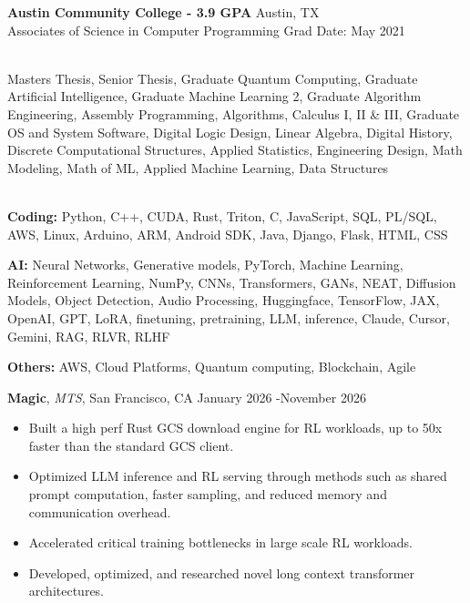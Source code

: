 \documentclass[a4paper,10pt]{article}
\begin{document}
\vspace{1pt}
\noindent\textbf{Austin Community College - \textbf{3.9 GPA}} \hfill Austin, TX \\
Associates of Science in Computer Programming \hfill Grad Date: May 2021

 \\
Masters Thesis, Senior Thesis, Graduate Quantum Computing, Graduate Artificial Intelligence, Graduate Machine Learning 2, Graduate Algorithm Engineering, Assembly Programming, Algorithms, Calculus I, II \& III, Graduate OS and System Software, Digital Logic Design, Linear Algebra, Digital History, Discrete Computational Structures, Applied Statistics, Engineering Design, Math Modeling, Math of ML, Applied Machine Learning, Data Structures


 \vspace{1pt} \\
\textbf{Coding:} Python, C++, CUDA, Rust, Triton, C, JavaScript, SQL, PL/SQL, AWS, Linux, Arduino, ARM, Android SDK, Java, Django, Flask, HTML, CSS

\noindent\textbf{AI:} Neural Networks, Generative models, PyTorch, Machine Learning, Reinforcement Learning, NumPy, CNNs, Transformers, GANs, NEAT, Diffusion Models, Object Detection, Audio Processing, Huggingface, TensorFlow, JAX, OpenAI, GPT, LoRA, finetuning, pretraining, LLM, inference, Claude, Cursor, Gemini, RAG, RLVR, RLHF

\noindent\textbf{Others:} AWS, Cloud Platforms, Quantum computing, Blockchain, Agile







 \vspace{1pt}

\noindent\textbf{Magic}, \textit{MTS}, San Francisco, CA \hfill January 2026 -November 2026
\begin{itemize}[noitemsep,topsep=0pt]
  \item Built a high perf Rust GCS download engine for RL workloads, up to 50x faster than the standard GCS client.
  \item Optimized LLM inference and RL serving through methods such as shared prompt computation, faster sampling, and reduced memory and communication overhead.
  \item Accelerated critical training bottlenecks in large scale RL workloads.
  \item Developed, optimized, and researched novel long context transformer architectures.
\end{itemize}
\end{document}
